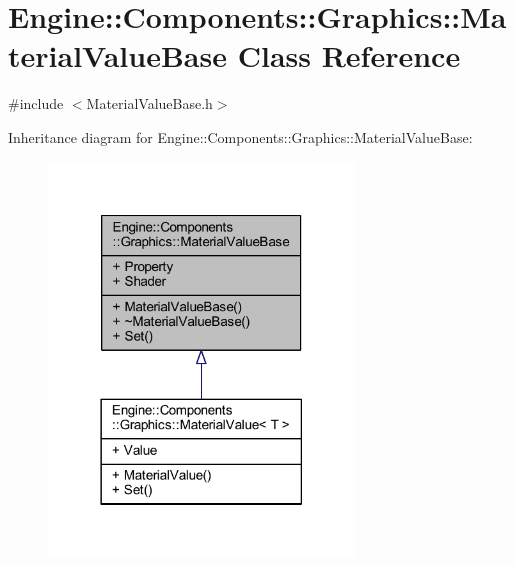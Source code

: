 \hypertarget{classEngine_1_1Components_1_1Graphics_1_1MaterialValueBase}{}\section{Engine\+:\+:Components\+:\+:Graphics\+:\+:Material\+Value\+Base Class Reference}
\label{classEngine_1_1Components_1_1Graphics_1_1MaterialValueBase}


{\ttfamily \#include $<$Material\+Value\+Base.\+h$>$}



Inheritance diagram for Engine\+:\+:Components\+:\+:Graphics\+:\+:Material\+Value\+Base\+:
\nopagebreak
\begin{figure}[H]
\begin{center}
\leavevmode
\includegraphics[width=230pt]{classEngine_1_1Components_1_1Graphics_1_1MaterialValueBase__inherit__graph}
\end{center}
\end{figure}


